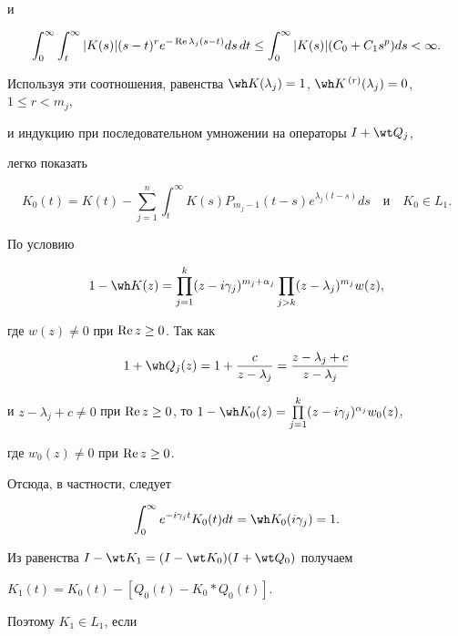 \begin{pf}
и 


$$ 


\int^\infty_0\int^\infty_t|K(s)|(s-t)^r 


e^{-\re\lambda_j(s-t)}ds\,dt\le\int^\infty_0 


|K(s)|(C_0+C_1 s^p)ds<\infty. 


$$ 


Используя эти соотношения, равенства $\wh K(\lambda_j)=1$, $\wh 


K^{\,(r)}(\lambda_j)=0$, $1\le r<m_j$, 


и индукцию при последовательном умножении на операторы $I+\wt Q_j$, 


легко показать 


$$ 


K_0(t)=K(t)-\sum^n_{j=1}\int^\infty_t K(s)P_{m_j-1} 


(t-s)e^{\lambda_j(t-s)}ds\quad 


\text{и}\quad K_0\in L_1. 


$$ 


По условию 


$$ 


1-\wh K(z)=\prod^k_{j=1}(z-i\gamma_j)^{m_j+\alpha_j} 


\prod_{j>k}(z-\lambda_j)^{m_j}w(z), 


$$ 


где $w(z)\ne0$ при $\operatorname{Re} z\ge0$. Так как 


$$ 


1+\wh Q_j(z)=1+\frac{c}{z-\lambda_j}=\frac{z-\lambda_j+c}{z-\lambda_j} 


$$ 


и $z-\lambda_j+c\ne0$ при $\re z\ge0$, то $1-\wh 


K_0(z)=\prod\limits^k_{j=1}(z-i\gamma_j)^{\alpha_j}w_0(z)$, 


где $w_0(z)\ne0$ при $\operatorname{Re} z\ge0$. 


Отсюда, в частности, следует 


$$ 


\int^\infty_0e^{-i\gamma_j t}K_0(t)dt= 


\wh K_0(i\gamma_j)=1. 


$$ 


 


Из равенства $I-\wt K_1=(I-\wt K_0)(I+\wt Q_0)$ получаем 


$K_1(t)=K_0(t)-[Q_0(t)-K_0*Q_0(t)]$. 


Поэтому $K_1\in L_1$, если 


$$ 



\end{pf}

